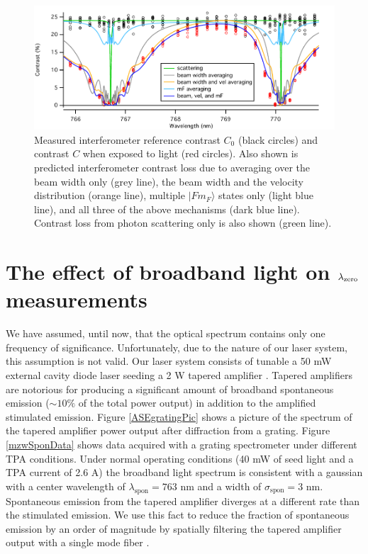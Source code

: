 \begin{figure}
\centerline{\includegraphics[width=1\textwidth]{Figures/cLossMechanisms.pdf}}
\caption[Interferometer contrast loss due to light between the potassium D1 and D2 lines.]{\label{MZWcLossFig}Measured interferometer reference contrast $C_0$ (black circles) and contrast $C$ when exposed to light (red circles). Also shown is predicted interferometer contrast loss due to averaging over the beam width only (grey line), the beam width and the velocity distribution (orange line), multiple $|Fm_F\rangle$ states only (light blue line), and all three of the above mechanisms (dark blue line). Contrast loss from photon scattering only is also shown (green line).}
\end{figure}



\section{The effect of broadband light on $\lambda_\textrm{zero}$ measurements}

We have assumed, until now, that the optical spectrum contains only one frequency of significance. Unfortunately, due to the nature of our laser system, this assumption is not valid. Our laser system consists of tunable a 50 mW external cavity diode laser seeding a 2 W tapered amplifier \cite{Haw01, Bol10, Nym06}. Tapered amplifiers are notorious for producing a significant amount of broadband spontaneous emission ($\sim10\%$ of the total power output) in addition to the amplified stimulated emission. Figure \ref{ASEgratingPic} shows a picture of the spectrum of the tapered amplifier power output after diffraction from a grating. Figure \ref{mzwSponData} shows data acquired with a grating spectrometer under different TPA conditions. Under normal operating conditions (40 mW of seed light and a TPA current of 2.6 A) the broadband light spectrum is consistent with a gaussian with a center wavelength of $\lambda_\textrm{spon}=763$ nm and a width of $\sigma_\textrm{spon}=3$ nm. Spontaneous emission from the tapered amplifier diverges at a different rate than the stimulated emission. We use this fact to reduce the fraction of spontaneous emission by an order of magnitude by spatially filtering the tapered amplifier output with a single mode fiber \cite{Voi01}. 


